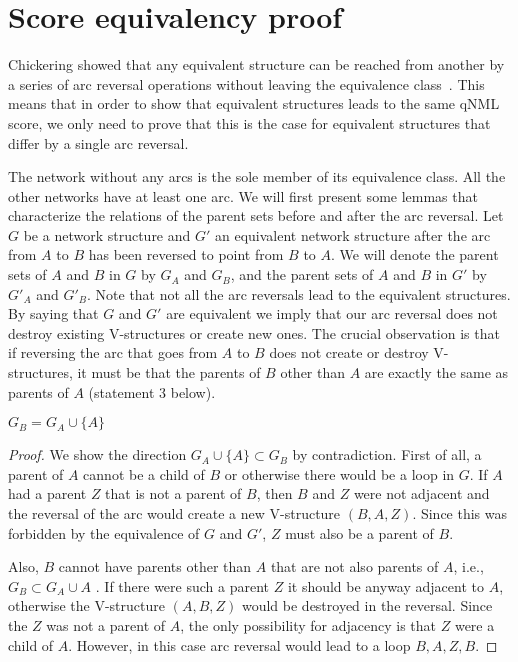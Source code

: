 \section{Score equivalency proof}

Chickering showed that any equivalent structure can be reached from
another by a series of arc reversal operations without leaving the
equivalence class~\cite{Chick95}. This means that in order to show
that equivalent structures leads to the same qNML score, we only need
to prove that this is the case for equivalent structures that differ
by a single arc reversal. 

The network without any arcs is the sole member of its equivalence
class. All the other networks have at least one arc. We will first
present some lemmas that characterize the relations of the parent sets
before and after the arc reversal. Let $G$ be a network structure
and $G'$ an equivalent network structure after the arc from $A$
to $B$ has been reversed to point from $B$ to $A$. We
will denote the parent sets of $A$ and $B$ in $G$ by $G_{A}$
and $G_{B}$, and the parent sets of $A$ and $B$ in $G'$ by $G'_{A}$
and $G'_{B}$. Note that not all the arc reversals lead to the equivalent
structures. By saying that $G$ and $G'$ are equivalent we imply
that our arc reversal does not destroy existing V-structures or create
new ones. The crucial observation is that if reversing the arc that
goes from $A$ to $B$ does not create or destroy V-structures, it
must be that the parents of $B$ other than $A$ are exactly the same
as parents of $A$ (statement 3 below). 

\begin{lemma}\label{thm:sameparents}
\item $G_{B}=G_{A}\cup\{A\}$
\end{lemma}

\begin{proof}
We show the direction $G_{A}\cup\{A\}\subset G_{B}$ 
by contradiction. First of all, a parent of $A$ cannot be a child
of $B$ or otherwise there would be a loop in $G.$ If $A$ had a
parent $Z$ that is not a parent of $B$, then $B$ and $Z$ were
not adjacent and the reversal of the arc would create a new V-structure
$(B,A,Z)$. Since this was forbidden by the equivalence of $G$ and
$G'$, $Z$ must also be a parent of $B$. 

Also, $B$ cannot have parents other than $A$ that are not also parents
of $A$, i.e., $G_{B}\subset G_{A}\cup{A}$ . If there were such
a parent $Z$ it should be anyway adjacent to $A$, otherwise the
V-structure $(A,B,Z)$ would be destroyed in the reversal. Since the
$Z$ was not a parent of $A$, the only possibility for adjacency
is that $Z$ were a child of $A$. However, in this case arc reversal
would lead to a loop $B,A,Z,B$.
\end{proof}

